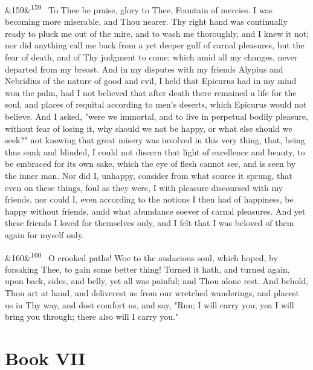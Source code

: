 \documentclass[12pt]{article}
\newcommand{\para}[1][]{\par\noindent\ifx&#1&\else\textsuperscript{\footnotesize #1}~\fi}
\begin{document}
\para[159] To Thee be praise, glory to Thee, Fountain of mercies. I was becoming more miserable, and Thou nearer. Thy right hand was continually ready to pluck me out of the mire, and to wash me thoroughly, and I knew it not; nor did anything call me back from a yet deeper gulf of carnal pleasures, but the fear of death, and of Thy judgment to come; which amid all my changes, never departed from my breast. And in my disputes with my friends Alypius and Nebridius of the nature of good and evil, I held that Epicurus had in my mind won the palm, had I not believed that after death there remained a life for the soul, and places of requital according to men's deserts, which Epicurus would not believe. And I asked, "were we immortal, and to live in perpetual bodily pleasure, without fear of losing it, why should we not be happy, or what else should we seek?" not knowing that great misery was involved in this very thing, that, being thus sunk and blinded, I could not discern that light of excellence and beauty, to be embraced for its own sake, which the eye of flesh cannot see, and is seen by the inner man. Nor did I, unhappy, consider from what source it sprung, that even on these things, foul as they were, I with pleasure discoursed with my friends, nor could I, even according to the notions I then had of happiness, be happy without friends, amid what abundance soever of carnal pleasures. And yet these friends I loved for themselves only, and I felt that I was beloved of them again for myself only.

\para[160] O crooked paths! Woe to the audacious soul, which hoped, by forsaking Thee, to gain some better thing! Turned it hath, and turned again, upon back, sides, and belly, yet all was painful; and Thou alone rest. And behold, Thou art at hand, and deliverest us from our wretched wanderings, and placest us in Thy way, and dost comfort us, and say, "Run; I will carry you; yea I will bring you through; there also will I carry you."

\section*{Book VII}
\end{document}
